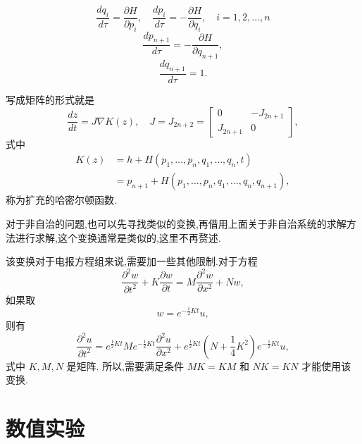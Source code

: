 \begin{equation*}
	\frac{dq_i}{d\tau}=\frac{\partial H}{\partial p_i},\quad \frac{dp_i}{d\tau}=-\frac{\partial H}{\partial q_i},\quad i=1,2,\ldots,n
\end{equation*}
\begin{equation*}
	\frac{dp_{n+1}}{d\tau} = -\frac{\partial H}{\partial q_{n+1}},
\end{equation*}
\begin{equation*}
	\frac{dq_{n+1}}{d\tau} =1.
\end{equation*}

写成矩阵的形式就是
\begin{equation*}
	\frac{dz}{dt}=J\nabla K(z),\quad J=J_{2n+2}=\begin{bmatrix}
	0&-J_{2n+1}\\
	J_{2n+1}&0
	\end{bmatrix},
\end{equation*}
式中
\begin{equation*}
	\begin{aligned}
		K(z)&=h+H(p_1,\ldots,p_n,q_1,\ldots,q_n,t)\\
		&=p_{n+1}+H(p_1,\ldots,p_n,q_1,\ldots,q_n,q_{n+1}),
	\end{aligned}
\end{equation*}
称为扩充的哈密尔顿函数.

对于非自治的问题,也可以先寻找类似的变换,再借用上面关于非自治系统的求解方法进行求解,这个变换通常是类似的,这里不再赘述.

该变换对于电报方程组来说,需要加一些其他限制.对于方程
\begin{equation*}
\frac{\partial ^2 w}{\partial t^2}+K\frac{\partial w}{\partial t}=M \frac{\partial ^2 w}{\partial x^2} + N w,
\end{equation*}
如果取
\begin{equation*}
w=e^{-\frac{1}{2}Kt}u,
\end{equation*}
则有
\begin{equation*}
\frac{\partial ^2 u}{\partial t^2}= e^{\frac{1}{2}Kt} M e^{-\frac{1}{2}Kt}\frac{\partial ^2 u}{\partial x^2} +
e^{\frac{1}{2}Kt}(N+\frac{1}{4}K^2)e^{-\frac{1}{2}Kt} u,
\end{equation*}
式中 $K,M,N$ 是矩阵. 所以,需要满足条件 $MK=KM$ 和 $NK=KN$ 才能使用该变换.

\section{数值实验}\label{sec:02numerical}

